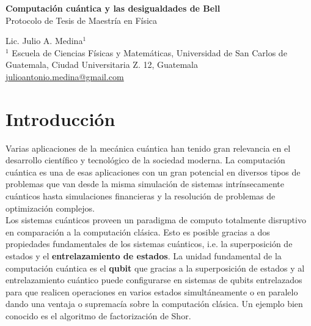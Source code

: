 \documentclass[a4paper]{article}
\begin{document}

\Large
 \begin{center}
\textbf{Computación cuántica y las desigualdades de Bell}\\
Protocolo de Tesis de Maestría en Física

\hspace{10pt}

\large
Lic. Julio A. Medina$^1$ \\

\hspace{10pt}
\small  
$^1$ Escuela de Ciencias Físicas y Matemáticas, Universidad de San Carlos de Guatemala, Ciudad Universitaria Z. 12, Guatemala\\


\href{mailto:julioantonio.medina@gmail.com}{julioantonio.medina@gmail.com}\\

\end{center}

\hspace{10pt}


\normalsize



\section{Introducción}
Varias aplicaciones de la mecánica cuántica han tenido gran relevancia en el desarrollo científico y tecnológico de la sociedad moderna. La computación cuántica es una de esas aplicaciones con un gran potencial en diversos tipos de problemas que van desde la misma simulación de sistemas intrínsecamente cuánticos hasta simulaciones financieras y la resolución de problemas de optimización complejos. \\

Los sistemas cuánticos proveen un paradigma de computo totalmente disruptivo en comparación a la computación clásica. Esto es posible gracias a dos propiedades fundamentales de los sistemas cuánticos, i.e. la superposición de estados y el \textbf{entrelazamiento de estados}. La unidad fundamental de la computación cuántica es el \textbf{qubit} que gracias a la superposición de estados y al entrelazamiento cuántico puede configurarse en sistemas de qubits entrelazados para que realicen operaciones en varios estados simultáneamente o en paralelo dando una ventaja o supremacía sobre la computación clásica. Un ejemplo bien conocido es el algoritmo de factorización de Shor\cite{Shor}.
\end{document}

